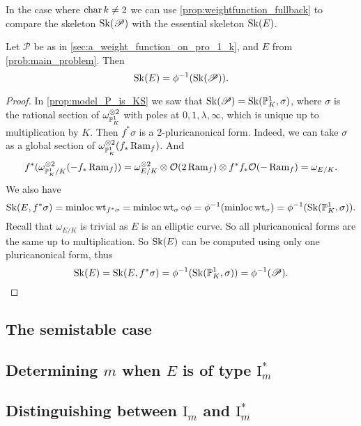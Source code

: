 In the case where $\operatorname{char} k \ne 2$ we can use \cref{prop:weightfunction_fullback} to compare the skeleton $\operatorname{Sk}(\mathscr P)$ with the essential skeleton $\operatorname{Sk}(E)$. 
\begin{lemma}\label{lem:sk_E_pulls_back}
	Let $\mathscr P$ be as in \cref{sec:a_weight_function_on_pro_1_k}, and $E$ from \cref{prob:main_problem}. 
	Then \[
		\sk(E) = \phi^{-1}(\sk(\mathscr P))
	.\] 
\end{lemma}
\begin{proof}
	In \cref{prop:model_P_is_KS} we saw that $\operatorname{Sk}(\mathscr P) = \operatorname{Sk}(\mathbb{P}^{1}_K, \sigma)$, where $\sigma$ is the rational section of $\omega_{\mathbb{P}^{1}_K}^{\otimes 2}$ with poles at $0, 1, \lambda, \infty$, which is unique up to multiplication by $K$. 
	Then $f^* \sigma$ is a $2$-pluricanonical form. 
	Indeed, we can take $\sigma$ as a global section of $\omega_{\mathbb{P}^{1}_K}^{\otimes 2}(f_* \operatorname{Ram} _f)$. 
	And 
	\[
		f^* (\omega_{\mathbb{P}^{1}_K / K}^{\otimes 2}(-f_* \operatorname{Ram} _f)) = \omega_{E /K}^{\otimes 2} \otimes \mathcal{O}(2 \operatorname{Ram}_f) \otimes f^*f_* \mathcal{O}(-\operatorname{Ram} _f) = \omega_{E / K}
	.\] 
	We also have 
	\[
		\sk(E, f^*\sigma) = \minloc \wt_{f^* \sigma} = \minloc \wt_{\sigma}\circ \phi = \phi^{-1}(\minloc \wt_\sigma) = \phi^{-1} (\sk(\pro^{1}_K, \sigma))
	.\] 
	Recall that $\omega_{E / K}$ is trivial as $E$ is an elliptic curve. 
	So all pluricanonical forms are the same up to multiplication. 
	So $\operatorname{Sk}(E)$ can be computed using only one pluricanonical form, thus \[
		\sk(E) = \sk(E, f^*\sigma) = \phi^{-1}(\sk(\pro^{1}_K, \sigma)) = \phi^{-1}(\mathscr P)
	.\] 
\end{proof}

\subsection{The semistable case} \label{sec:the_semistable_case}


\subsection{Determining $m$ when $E$ is of type $\mathrm I_m^*$} \label{sec:determining_m_when_e_is_of_type_ims}


\subsection{Distinguishing between $\mathrm I_m$ and  $\mathrm I_m^*$} \label{sec:distinguishing_between_im_and_ims}

